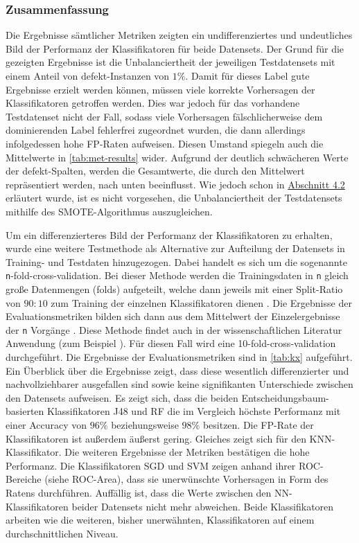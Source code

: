 \subsubsection*{Zusammenfassung}
Die Ergebnisse sämtlicher Metriken zeigten ein undifferenziertes und undeutliches Bild der Performanz der Klassifikatoren für beide Datensets. Der Grund für die gezeigten Ergebnisse ist die Unbalanciertheit der jeweiligen Testdatensets mit einem Anteil von \glqq defekt\grqq -Instanzen von $1\%$. Damit für dieses Label gute Ergebnisse erzielt werden können, müssen viele korrekte Vorhersagen der Klassifikatoren getroffen werden. Dies war jedoch für das vorhandene Testdatenset nicht der Fall, sodass viele Vorhersagen fälschlicherweise dem dominierenden Label \glqq fehlerfrei\grqq{} zugeordnet wurden, die dann allerdings infolgedessen hohe FP-Raten aufweisen. Diesen Umstand spiegeln auch die Mittelwerte in \autoref{tab:met-results} wider. Aufgrund der deutlich schwächeren Werte der \glqq defekt\grqq -Spalten, werden die Gesamtwerte, die durch den Mittelwert repräsentiert werden, nach unten beeinflusst. Wie jedoch schon in \hyperref[smote]{Abschnitt 4.2} erläutert wurde, ist es nicht vorgesehen, die Unbalanciertheit der Testdatensets mithilfe des SMOTE-Algorithmus auszugleichen.

Um ein differenzierteres Bild der Performanz der Klassifikatoren zu erhalten, wurde eine weitere Testmethode als Alternative zur Aufteilung der Datensets in Training- und Testdaten hinzugezogen. Dabei handelt es sich um die sogenannte \glqq \texttt{n}-fold-cross-validation\grqq. Bei dieser Methode werden die Trainingsdaten in \texttt{n} gleich große Datenmengen (\glqq folds\grqq) aufgeteilt, welche dann jeweils mit einer Split-Ratio von $90:10$ zum Training der einzelnen Klassifikatoren dienen \cite{IanWitten}. Die Ergebnisse der Evaluationsmetriken bilden sich dann aus dem Mittelwert der Einzelergebnisse der \texttt{n} Vorgänge \cite{IanWitten}. Diese Methode findet auch in der wissenschaftlichen Literatur Anwendung (zum Beispiel \cite{Alam2013,Chawla2002,Alsaeedi2019}). Für diesen Fall wird eine 10-fold-cross-validation durchgeführt. Die Ergebnisse der Evaluationsmetriken sind in \autoref{tab:kx} aufgeführt. Ein Überblick über die Ergebnisse zeigt, dass diese wesentlich differenzierter und nachvollziehbarer ausgefallen sind sowie keine signifikanten Unterschiede zwischen den Datensets aufweisen. Es zeigt sich, dass die beiden Entscheidungsbaum-basierten Klassifikatoren J48 und RF die im Vergleich höchste Performanz mit einer Accuracy von $96\%$ beziehungsweise $98\%$ besitzen. Die FP-Rate der Klassifikatoren ist außerdem äußerst gering. Gleiches zeigt sich für den KNN-Klassifikator. Die weiteren Ergebnisse der Metriken bestätigen die hohe Performanz. Die Klassifikatoren SGD und SVM zeigen anhand ihrer ROC-Bereiche (siehe ROC-Area), dass sie unerwünschte Vorhersagen in Form des \glqq Ratens\grqq{} durchführen. Auffällig ist, dass die Werte zwischen den NN-Klassifikatoren beider Datensets nicht mehr abweichen. Beide Klassifikatoren arbeiten wie die weiteren, bisher unerwähnten, Klassifikatoren auf einem durchschnittlichen Niveau.

